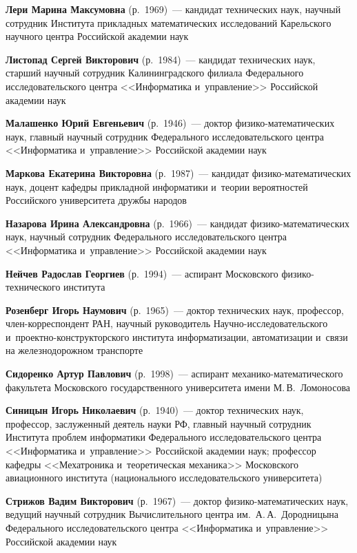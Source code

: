 \begin{multicols}{2}
 \noindent
 \textbf{Лери  Марина Максумовна} (р.\ 1969)~--- кандидат технических наук, научный сотрудник Института
 прикладных математических исследований Карельского научного центра Российской академии наук

\noindent
\textbf{Листопад Сергей Викторович} (р.\ 1984)~--- 
кандидат технических наук, старший научный со\-труд\-ник Калининградского филиала Федерального исследовательского цент\-ра 
<<Информатика и~управ\-ле\-ние>> Российской академии наук
 
\noindent
\textbf{Малашенко Юрий Евгеньевич} (р.\ 1946)~--- доктор фи\-зи\-ко-ма\-те\-ма\-ти\-че\-ских наук, 
главный научный сотрудник Федерального исследовательского цент\-ра <<Информатика и~управ\-ле\-ние>> Российской академии наук

\noindent
\textbf{Маркова Екатерина Викторовна} (р.\ 1987)~--- кандидат 
фи\-зи\-ко-ма\-те\-ма\-ти\-че\-ских наук, доцент ка\-фед\-ры при\-клад\-ной информатики и~тео\-рии вероятностей Российского университета друж\-бы народов

\noindent
\textbf{Назарова Ирина Александровна} (р.\ 1966)~--- кандидат фи\-зи\-ко-ма\-те\-ма\-ти\-че\-ских наук, 
научный сотрудник Федерального исследовательского цент\-ра <<Информатика и~управ\-ле\-ние>> Российской академии наук

\noindent
\textbf{Нейчев Радослав Георгиев} (р.\ 1994)~--- аспирант Мос\-ков\-ско\-го фи\-зи\-ко-тех\-ни\-че\-ско\-го института


\noindent
\textbf{Розенберг Игорь Наумович} (р.\ 1965)~--- 
доктор технических наук, профессор, член-кор\-рес\-пон\-дент РАН, научный руководитель На\-уч\-но-ис\-сле\-до\-ва\-тель\-ско\-го 
и~про\-ект\-но-конст\-рук\-тор\-ско\-го института информатизации, автоматизации и~связи на железнодорожном транспорте

\noindent
\textbf{Сидоренко Артур Павлович} (р.\ 1998)~--- аспирант ме\-ха\-ни\-ко-ма\-те\-ма\-ти\-че\-ско\-го 
факультета Московского государственного университета имени М.\,В.~Ломоносова

\noindent
\textbf{Синицын Игорь Николаевич} (р.\ 1940)~--- 
доктор технических наук, профессор, заслуженный деятель науки РФ, главный научный сотрудник Института проб\-лем 
информатики Федерального исследовательского цент\-ра <<Информатика и~управ\-ле\-ние>>
 Российской академии наук; профессор ка\-фед\-ры <<Мехатроника и~тео\-ре\-ти\-че\-ская механика>>
  Московского авиационного института (национального исследовательского университета)

\noindent
\textbf{Стрижов Вадим Викторович} (р.\ 1967)~--- доктор фи\-зи\-ко-ма\-те\-ма\-ти\-че\-ских наук, 
ведущий научный сотрудник Вы\-чис\-ли\-тель\-но\-го цент\-ра им.\ А.\,А.~Дородницына Федерального исследовательского цент\-ра 
<<Информатика и~управ\-ле\-ние>> Российской академии наук


\end{multicols}
